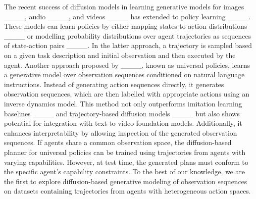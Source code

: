 The recent success of diffusion models in learning generative models for images ____, audio ____, and videos ____ has extended to policy learning ____. These models can learn policies by either mapping states to action distributions ____ or modelling probability distributions over agent trajectories as sequences of state-action pairs ____. In the latter approach, a trajectory is sampled based on a given task description and initial observation and then executed by the agent. Another approach proposed by ____, known as universal policies, learns a generative model over observation sequences conditioned on natural language instructions. Instead of generating action sequences directly, it generates observation sequences, which are then labelled with appropriate actions using an inverse dynamics model. This method not only outperforms imitation learning baselines ____ and trajectory-based diffusion models ____ but also shows potential for integration with text-to-video foundation models. Additionally, it enhances interpretability by allowing inspection of the generated observation sequences. If agents share a common observation space, the diffusion-based planner for universal policies can be trained using trajectories from agents with varying capabilities. However, at test time, the generated plans must conform to the specific agent’s capability constraints. To the best of our knowledge, we are the first to explore diffusion-based generative modeling of observation sequences on datasets containing trajectories from agents with heterogeneous action spaces.